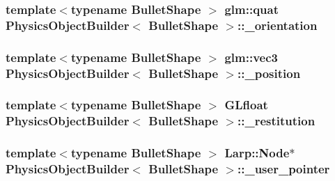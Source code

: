 \subsubsection[{\texorpdfstring{\+\_\+orientation}{_orientation}}]{\setlength{\rightskip}{0pt plus 5cm}template$<$typename Bullet\+Shape $>$ glm\+::quat {\bf Physics\+Object\+Builder}$<$ Bullet\+Shape $>$\+::\+\_\+orientation\hspace{0.3cm}{\ttfamily [private]}}\hypertarget{classPhysicsObjectBuilder_a2ae872b2cecfc395683f1d014ed00865}{}\label{classPhysicsObjectBuilder_a2ae872b2cecfc395683f1d014ed00865}
\subsubsection[{\texorpdfstring{\+\_\+position}{_position}}]{\setlength{\rightskip}{0pt plus 5cm}template$<$typename Bullet\+Shape $>$ glm\+::vec3 {\bf Physics\+Object\+Builder}$<$ Bullet\+Shape $>$\+::\+\_\+position\hspace{0.3cm}{\ttfamily [private]}}\hypertarget{classPhysicsObjectBuilder_a76712f3e56a0c25ffcc9c304b87fe2f5}{}\label{classPhysicsObjectBuilder_a76712f3e56a0c25ffcc9c304b87fe2f5}
\subsubsection[{\texorpdfstring{\+\_\+restitution}{_restitution}}]{\setlength{\rightskip}{0pt plus 5cm}template$<$typename Bullet\+Shape $>$ G\+Lfloat {\bf Physics\+Object\+Builder}$<$ Bullet\+Shape $>$\+::\+\_\+restitution\hspace{0.3cm}{\ttfamily [private]}}\hypertarget{classPhysicsObjectBuilder_a9858423d054afb6e73b95de7ec5aa565}{}\label{classPhysicsObjectBuilder_a9858423d054afb6e73b95de7ec5aa565}
\subsubsection[{\texorpdfstring{\+\_\+user\+\_\+pointer}{_user_pointer}}]{\setlength{\rightskip}{0pt plus 5cm}template$<$typename Bullet\+Shape $>$ {\bf Larp\+::\+Node}$\ast$ {\bf Physics\+Object\+Builder}$<$ Bullet\+Shape $>$\+::\+\_\+user\+\_\+pointer\hspace{0.3cm}{\ttfamily [private]}}\hypertarget{classPhysicsObjectBuilder_abed841349d737d4ba25b825d200c9452}{}\label{classPhysicsObjectBuilder_abed841349d737d4ba25b825d200c9452}


